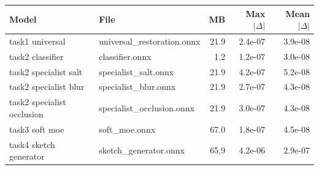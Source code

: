\begin{tabular}{llrrr}
\toprule
Model & File & MB & Max $|\Delta|$ & Mean $|\Delta|$ \\
\midrule
task1 universal & universal\_restoration.onnx & 21.9 & 2.4e-07 & 3.9e-08 \\
task2 classifier & classifier.onnx & 1.2 & 1.2e-07 & 3.0e-08 \\
task2 specialist salt & specialist\_salt.onnx & 21.9 & 4.2e-07 & 5.2e-08 \\
task2 specialist blur & specialist\_blur.onnx & 21.9 & 2.7e-07 & 4.3e-08 \\
task2 specialist occlusion & specialist\_occlusion.onnx & 21.9 & 3.0e-07 & 4.3e-08 \\
task3 soft moe & soft\_moe.onnx & 67.0 & 1.8e-07 & 4.5e-08 \\
task4 sketch generator & sketch\_generator.onnx & 65.9 & 4.2e-06 & 2.9e-07 \\
\bottomrule
\end{tabular}
